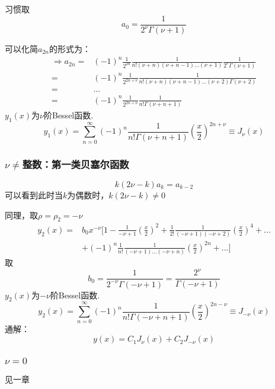     习惯取$$a_0=\frac{1}{2^\nu\Gamma(\nu+1)}$$

    可以化简$a_{2n}$的形式为：
    $$\begin{aligned}
    \Rightarrow a_{2n}=&(-1)^n\frac{1}{2^{2n}}\frac{1}{n!(\nu+n)(\nu+n-1)...(\nu+1)}\frac{1}{2^\nu\Gamma(\nu+1)}\\
    =&(-1)^n\frac{1}{2^{2n+\nu}}\frac{1}{n!(\nu+n)(\nu+n-1)...(\nu+2)\Gamma(\nu+2)}\\
    =&...\\
    =&(-1)^n\frac{1}{2^{2n+\nu}}\frac{1}{n!\Gamma(\nu+n+1)}
    \end{aligned}$$
    $y_1(x)$为$\nu$阶Bessel函数.
    $$y_1(x)=\sum_{n=0}^\infty(-1)^n\frac{1}{n!\Gamma(\nu+n+1)}\left(\frac{x}{2}\right)^{2n+\nu}\equiv J_\nu(x)$$

\subsubsection{$\nu\ne$整数：第一类贝塞尔函数}
    $$k(2\nu-k)a_k=a_{k-2}$$
    可以看到此时当$k$为偶数时，$k(2\nu-k)\ne0$

    同理，取$\rho=\rho_2=-\nu$
    $$\begin{aligned}
    y_2(x)=&b_0x^{-\nu}[1-\frac{1}{-\nu+1}\left(\frac{x}{2}\right)^2+\frac{1}{2!}\frac{1}{(-\nu+1)(-\nu+2)}\left(\frac{x}{2}\right)^4+...
    \\&+(-1)^n\frac{1}{n!}\frac{1}{(-\nu+1)...(-\nu+n)}\left(\frac{x}{2}\right)^{2n}+...]
    \end{aligned}$$
    取$$b_0=\frac{1}{2^{-\nu}\Gamma(-\nu+1)}=\frac{2^\nu}{\Gamma(-\nu+1)}$$
    $y_2(x)$为$-\nu$阶Bessel函数.
    $$y_2(x)=\sum_{n=0}^\infty(-1)^n\frac{1}{n!\Gamma(-\nu+n+1)}\left(\frac{x}{2}\right)^{2n-\nu}\equiv J_{-\nu}(x)$$
    通解：$$y(x)=C_1J_\nu(x)+C_2J_{-\nu}(x)$$


\subsubsection{$\nu=0$}
见一章




